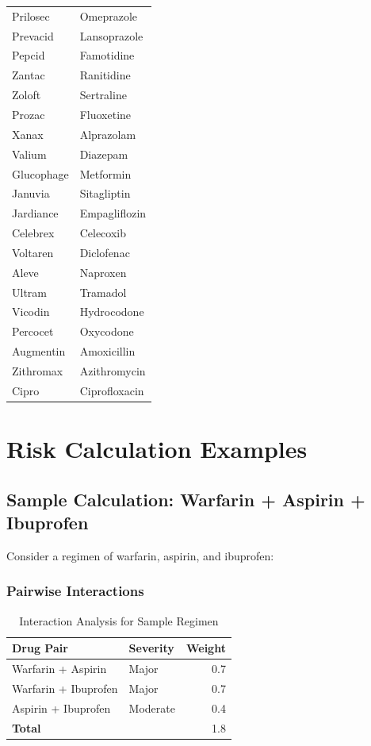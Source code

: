 \documentclass[11pt,a4paper]{article}
\begin{document}
\begin{longtable}{ll}
Prilosec & Omeprazole \\
Prevacid & Lansoprazole \\
Pepcid & Famotidine \\
Zantac & Ranitidine \\
\midrule
Zoloft & Sertraline \\
Prozac & Fluoxetine \\
\midrule
Xanax & Alprazolam \\
Valium & Diazepam \\
\midrule
Glucophage & Metformin \\
Januvia & Sitagliptin \\
Jardiance & Empagliflozin \\
\midrule
Celebrex & Celecoxib \\
Voltaren & Diclofenac \\
Aleve & Naproxen \\
Ultram & Tramadol \\
Vicodin & Hydrocodone \\
Percocet & Oxycodone \\
\midrule
Augmentin & Amoxicillin \\
Zithromax & Azithromycin \\
Cipro & Ciprofloxacin \\
\end{longtable}

\section{Risk Calculation Examples}

\subsection{Sample Calculation: Warfarin + Aspirin + Ibuprofen}

Consider a regimen of warfarin, aspirin, and ibuprofen:

\subsubsection{Pairwise Interactions}

\begin{table}[H]
\centering
\caption{Interaction Analysis for Sample Regimen}
\label{tab:example}
\begin{tabular}{llr}
\toprule
\textbf{Drug Pair} & \textbf{Severity} & \textbf{Weight} \\
\midrule
Warfarin + Aspirin & Major & 0.7 \\
Warfarin + Ibuprofen & Major & 0.7 \\
Aspirin + Ibuprofen & Moderate & 0.4 \\
\midrule
\textbf{Total} & & 1.8 \\
\bottomrule
\end{tabular}
\end{table}
\end{document}
